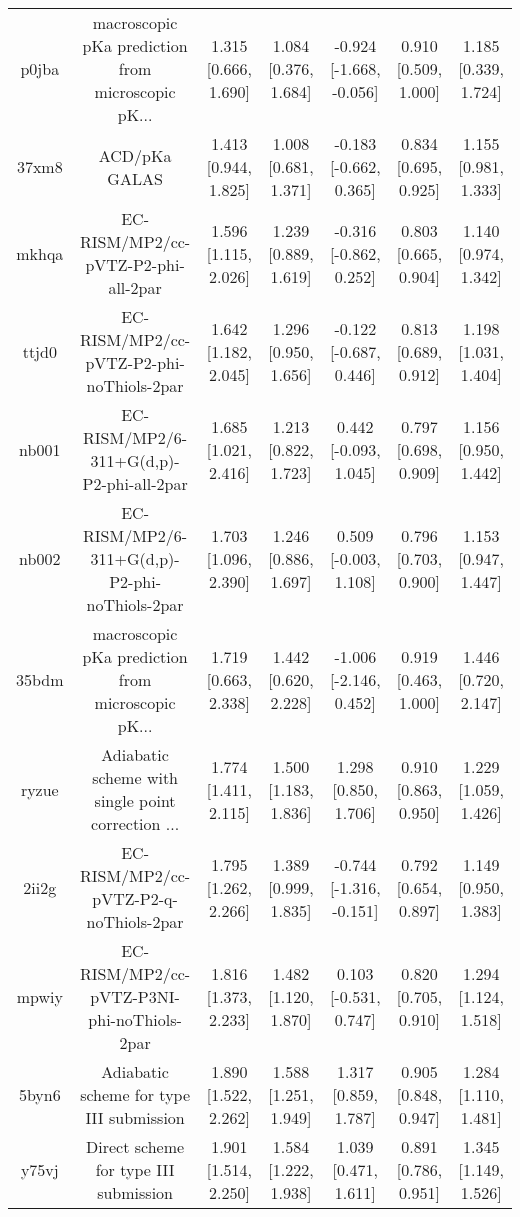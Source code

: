 \documentclass{article}
\begin{document}
\begin{center}
\begin{longtable}{|ccccccc|}
 p0jba &  macroscopic pKa prediction from microscopic pK... &  1.315 [0.666, 1.690] &  1.084 [0.376, 1.684] &  -0.924 [-1.668, -0.056] &  0.910 [0.509, 1.000] &   1.185 [0.339, 1.724] \\
 37xm8 &                                      ACD/pKa GALAS &  1.413 [0.944, 1.825] &  1.008 [0.681, 1.371] &   -0.183 [-0.662, 0.365] &  0.834 [0.695, 0.925] &   1.155 [0.981, 1.333] \\
 mkhqa &                EC-RISM/MP2/cc-pVTZ-P2-phi-all-2par &  1.596 [1.115, 2.026] &  1.239 [0.889, 1.619] &   -0.316 [-0.862, 0.252] &  0.803 [0.665, 0.904] &   1.140 [0.974, 1.342] \\
 ttjd0 &           EC-RISM/MP2/cc-pVTZ-P2-phi-noThiols-2par &  1.642 [1.182, 2.045] &  1.296 [0.950, 1.656] &   -0.122 [-0.687, 0.446] &  0.813 [0.689, 0.912] &   1.198 [1.031, 1.404] \\
 nb001 &           EC-RISM/MP2/6-311+G(d,p)-P2-phi-all-2par &  1.685 [1.021, 2.416] &  1.213 [0.822, 1.723] &    0.442 [-0.093, 1.045] &  0.797 [0.698, 0.909] &   1.156 [0.950, 1.442] \\
 nb002 &      EC-RISM/MP2/6-311+G(d,p)-P2-phi-noThiols-2par &  1.703 [1.096, 2.390] &  1.246 [0.886, 1.697] &    0.509 [-0.003, 1.108] &  0.796 [0.703, 0.900] &   1.153 [0.947, 1.447] \\
 35bdm &  macroscopic pKa prediction from microscopic pK... &  1.719 [0.663, 2.338] &  1.442 [0.620, 2.228] &   -1.006 [-2.146, 0.452] &  0.919 [0.463, 1.000] &   1.446 [0.720, 2.147] \\
 ryzue &  Adiabatic scheme with single point correction ... &  1.774 [1.411, 2.115] &  1.500 [1.183, 1.836] &     1.298 [0.850, 1.706] &  0.910 [0.863, 0.950] &   1.229 [1.059, 1.426] \\
 2ii2g &             EC-RISM/MP2/cc-pVTZ-P2-q-noThiols-2par &  1.795 [1.262, 2.266] &  1.389 [0.999, 1.835] &  -0.744 [-1.316, -0.151] &  0.792 [0.654, 0.897] &   1.149 [0.950, 1.383] \\
 mpwiy &         EC-RISM/MP2/cc-pVTZ-P3NI-phi-noThiols-2par &  1.816 [1.373, 2.233] &  1.482 [1.120, 1.870] &    0.103 [-0.531, 0.747] &  0.820 [0.705, 0.910] &   1.294 [1.124, 1.518] \\
 5byn6 &           Adiabatic scheme for type III submission &  1.890 [1.522, 2.262] &  1.588 [1.251, 1.949] &     1.317 [0.859, 1.787] &  0.905 [0.848, 0.947] &   1.284 [1.110, 1.481] \\
 y75vj &              Direct scheme for type III submission &  1.901 [1.514, 2.250] &  1.584 [1.222, 1.938] &     1.039 [0.471, 1.611] &  0.891 [0.786, 0.951] &   1.345 [1.149, 1.526] \\

\end{longtable}
\end{center}
\end{document}
